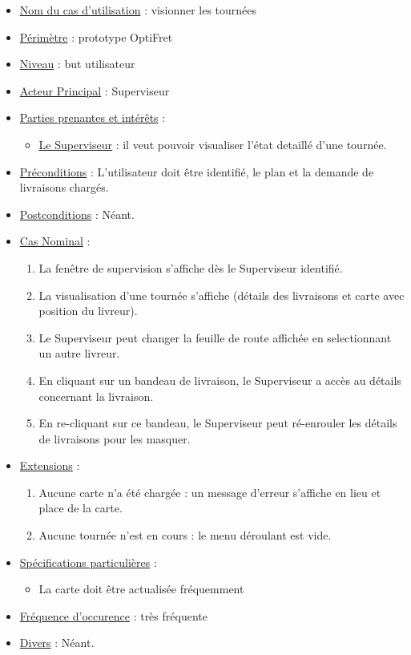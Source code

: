 \documentclass[a4paper]{article}
\begin{document}
\begin{itemize}[label = \textbullet, font = \color{orange}]
    \item \underline{Nom du cas d'utilisation} : visionner les tournées
    \item \underline{Périmètre} : prototype OptiFret
    \item \underline{Niveau} : but utilisateur
    \item \underline{Acteur Principal} : Superviseur
    \item \underline{Parties prenantes et intérêts} :
        \begin{itemize}[label = \textbullet, font = \color{blue}]
            \item \underline{Le Superviseur} : il veut pouvoir visualiser
                l'état detaillé d'une tournée.
        \end{itemize}
    \item \underline{Préconditions} : L'utilisateur doit être identifié, le
        plan et la demande de livraisons chargés.
    \item \underline{Postconditions} : Néant.
    \item \underline{Cas Nominal} :
    \begin{enumerate}
        \item La fenêtre de supervision s'affiche dès le Superviseur identifié.
        \item La visualisation d'une tournée s'affiche (détails des livraisons
            et carte avec position du livreur).
        \item Le Superviseur peut changer la feuille de route affichée en
            selectionnant un autre livreur.
        \item En cliquant sur un bandeau de livraison, le Superviseur a accès
            au détails concernant la livraison.
        \item En re-cliquant sur ce bandeau, le Superviseur peut ré-enrouler
            les détails de livraisons pour les masquer.
    \end{enumerate}
    \item \underline{Extensions} :
    \begin{enumerate}
        \item Aucune carte n'a été chargée : un message d'erreur s'affiche en
            lieu et place de la carte.
        \item Aucune tournée n'est en cours : le menu déroulant est vide.
    \end{enumerate}
    \item \underline{Spécifications particulières} :
    \begin{itemize}[label = \textbullet, font = \color{blue}]
        \item La carte doit être actualisée fréquemment
    \end{itemize}
    \item \underline{Fréquence d'occurence} : très fréquente
    \item \underline{Divers} : Néant.
\end{itemize}
\end{document}
